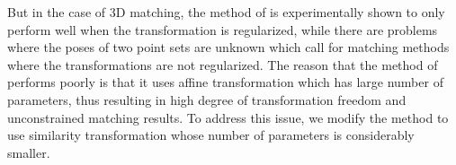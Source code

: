 \documentclass[11pt,bezier,]{article}
\begin{document}
But
in the case of 3D matching, 
the method of \cite{RPM_PF_aff} is experimentally shown to only perform well when the transformation is regularized,
while there are problems where the poses of two point sets are unknown 
which call for matching methods where the transformations are not regularized.
The reason 
that the method of \cite{RPM_PF_aff} performs poorly 
is that it uses  affine transformation
which has large number of parameters,
thus resulting in high degree of transformation freedom and unconstrained matching results.
To address this issue, 
we modify  the method to use similarity transformation
whose number of parameters is considerably smaller. %

 
% 
\end{document}
